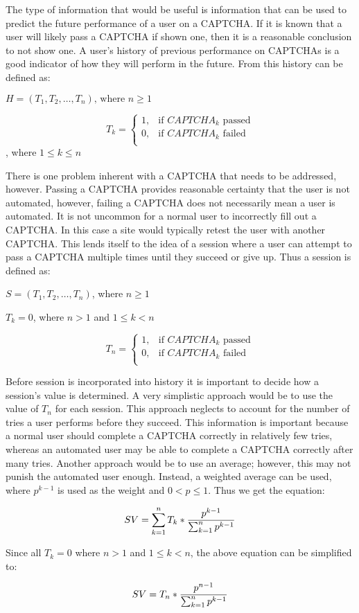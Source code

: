 \documentclass[journal, 12pt, onecolumn, draftclsnofoot]{IEEEtran}
\begin{document}
The type of information that would be useful is information that can be used to predict the future performance of a user on a CAPTCHA. If it is known that a user will likely pass a CAPTCHA if shown one, then it is a reasonable conclusion to not show one. A user’s history of previous performance on CAPTCHAs is a good indicator of how they will perform in the future. From this history can be defined as:

$H = (T_1,T_2,\ldots,T_n )\text{, where }n \geq 1$

\[
T_k =
  \begin{cases}
    1, &\text{if $CAPTCHA_k$ passed}\\
    0, &\text{if $CAPTCHA_k$ failed}\\
  \end{cases}
\], where $1 \leq k \leq n$

There is one problem inherent with a CAPTCHA that needs to be addressed, however. Passing a CAPTCHA provides reasonable certainty that the user is not automated, however, failing a CAPTCHA does not necessarily mean a user is automated. It is not uncommon for a normal user to incorrectly fill out a CAPTCHA. In this case a site would typically retest the user with another CAPTCHA. This lends itself to the idea of a session where a user can attempt to pass a CAPTCHA multiple times until they succeed or give up. Thus a session is defined as:

$S=(T_1,T_2,\ldots,T_n )$, where $n \geq 1$

$T_k = 0$, where $n > 1$ and $1 \leq k < n$

\[
T_n =
  \begin{cases}
    1, &\text{if $CAPTCHA_k$ passed}\\
    0, &\text{if $CAPTCHA_k$ failed}\\
  \end{cases}
\]

Before session is incorporated into history it is important to decide how a session’s value is determined. A very simplistic approach would be to use the value of $T_n$ for each session. This approach neglects to account for the number of tries a user performs before they succeed. This information is important because a normal user should complete a CAPTCHA correctly in relatively few tries, whereas an automated user may be able to complete a CAPTCHA correctly after many tries. Another approach would be to use an average; however, this may not punish the automated user enough. Instead, a weighted average can be used, where $p^{k-1}$ is used as the weight and $0 < p \leq 1$. Thus we get the equation:

\[
  SV =
    \sum_{k=1}^n T_k * {
      p^{k-1} \over \sum_{k=1}^n p^{k-1}
    }
\]

  Since all $T_k = 0$ where $n > 1$ and $1 \leq k < n$, the above equation can be simplified to:

\[
  SV =
    T_n * {
      p^{n - 1} \over \sum_{k=1}^n p^{k-1}
    }
\]

\newpage



\end{document}
